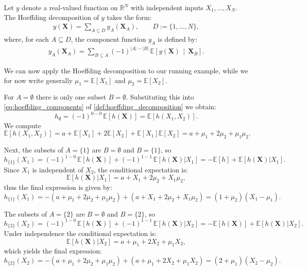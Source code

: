 \begin{definition}\label{def:hoeffding_decomposition}
Let $y$ denote a real-valued function on $\mathbb{R}^N$ with independent inputs $X_1, \dots, X_N$. The Hoeffding decomposition of $y$ takes the form:
\begin{align}
    y(\boldsymbol{X})
=
\sum_{A \subseteq D} 
y_A(\boldsymbol{X}_A),
\qquad
D := \{1,\dots,N\},
\end{align}
where, for each $A \subseteq D$, the component function $y_A$ is defined by:
\begin{align}\label{eq:hoeffding_components}
    y_A(\boldsymbol{X}_A)
=
\sum_{B \subseteq A}
(-1)^{|A|-|B|}
\,\mathbb{E}\!\left[
  y(\boldsymbol{X}) 
  \,\middle|\, 
  \boldsymbol{X}_B
\right].
\end{align}
\end{definition}

We can now apply the Hoeffding decomposition to our running example, while we for now write generally $\mu_1 = \mathbb{E}[X_1]$ and $\mu_2 = \mathbb{E}[X_2]$.\par

For $A=\emptyset$ there is only one subset $B=\emptyset$. 
Substituting this into \autoref{eq:hoeffding_components} of \autoref{def:hoeffding_decomposition} we obtain:
\[
h_{\emptyset}
=
(-1)^{0-0}\,
\mathbb{E}[h(\boldsymbol{X})]
=
\mathbb{E}[h(X_1,X_2)].
\]
We compute
\[
\mathbb{E}[h(X_1,X_2)]
= a + \mathbb{E}[X_1] + 2 \mathbb{E}[X_2] 
  + \mathbb{E}[X_1]\mathbb{E}[X_2]
= a + \mu_1 + 2\mu_2 + \mu_1\mu_2.
\]

Next, the subsets of $A=\{1\}$ are $B=\emptyset$ and $B=\{1\}$, so
\[
h_{\{1\}}(X_1)
=
(-1)^{1-0}\,\mathbb{E}[h(\boldsymbol{X})]
+
(-1)^{1-1}\,\mathbb{E}[h(\boldsymbol{X})|X_1]
=
-\mathbb{E}[h] + \mathbb{E}[h(\boldsymbol{X})|X_1].
\]
Since $X_1$ is independent of $X_2$, the conditional expectation is:
\[
\mathbb{E}[h(\boldsymbol{X})|X_1]
= a + X_1 + 2\mu_2 + X_1 \mu_2,
\]
thus the final expression is given by:
\[
h_{\{1\}}(X_1)
= - (a+\mu_1+2\mu_2+\mu_1\mu_2) + (a+X_1+2\mu_2+X_1\mu_2)
= (1+\mu_2)(X_1 - \mu_1).
\]

The subsets of $A=\{2\}$ are $B=\emptyset$ and $B=\{2\}$, so
\[
h_{\{2\}}(X_2)
=
(-1)^{1-0}\,\mathbb{E}[h(\boldsymbol{X})]
+
(-1)^{1-1}\,\mathbb{E}[h(\boldsymbol{X})|X_2]
=
-\mathbb{E}[h(\boldsymbol{X})] + \mathbb{E}[h(\boldsymbol{X})|X_2].
\]
Under independence the conditional expectation is:
\[
\mathbb{E}[h(\boldsymbol{X})|X_2]
= a + \mu_1 + 2X_2 + \mu_1 X_2,
\]
which yields the final expression:
\[
h_{\{2\}}(X_2)
= - (a+\mu_1+2\mu_2+\mu_1\mu_2) + (a+\mu_1+2X_2+\mu_1 X_2)
= (2+\mu_1)(X_2 - \mu_2).
\]

